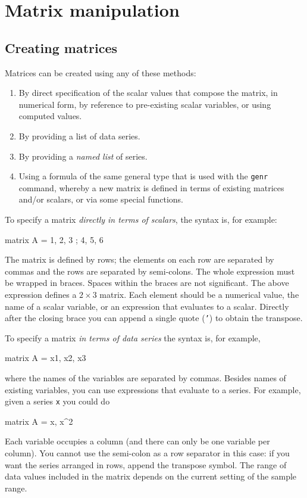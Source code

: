 \chapter{Matrix manipulation}
\label{chap:matrices}

\section{Creating matrices}
\label{matrix-create}

Matrices can be created using any of these methods:

\begin{enumerate}
\item By direct specification of the scalar values that compose the
  matrix, in numerical form, by reference to pre-existing
  scalar variables, or using computed values.
\item By providing a list of data series.
\item By providing a \textit{named list} of series.
\item Using a formula of the same general type that is used
  with the \texttt{genr} command, whereby a new matrix is defined
  in terms of existing matrices and/or scalars, or via some
  special functions.
\end{enumerate}

To specify a matrix \textit{directly in terms of scalars}, the syntax
is, for example:

\begin{code}
matrix A = { 1, 2, 3 ; 4, 5, 6 }
\end{code}

The matrix is defined by rows; the elements on each row are separated
by commas and the rows are separated by semi-colons.  The whole
expression must be wrapped in braces.  Spaces within the braces are
not significant.  The above expression defines a $2\times3$ matrix.
Each element should be a numerical value, the name of a scalar
variable, or an expression that evaluates to a scalar.  Directly after
the closing brace you can append a single quote (\texttt{'}) to obtain
the transpose.

To specify a matrix \textit{in terms of data series} the syntax is,
for example,
%
\begin{code}
matrix A = { x1, x2, x3 }
\end{code}
%
where the names of the variables are separated by commas.  Besides
names of existing variables, you can use expressions that evaluate to
a series.  For example, given a series \texttt{x} you could do
%
\begin{code}
matrix A = { x, x^2 }
\end{code}
%
Each variable occupies a column (and there can only be one variable
per column).  You cannot use the semi-colon as a row separator in this
case: if you want the series arranged in rows, append the transpose
symbol.  The range of data values included in the matrix depends on
the current setting of the sample range.

